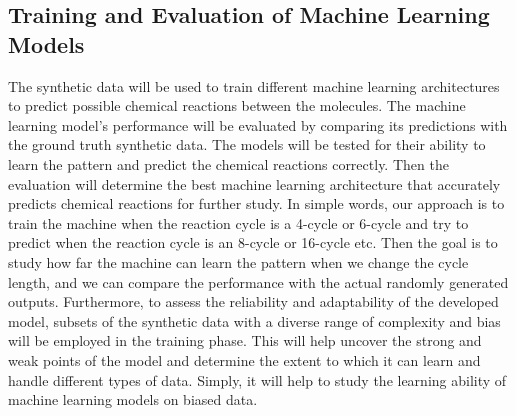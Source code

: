\documentclass{article}
\begin{document}
\subsection{Training and Evaluation of Machine Learning Models}
The synthetic data will be used to train different machine learning architectures to predict possible chemical reactions between the molecules. The machine learning model's performance will be evaluated by comparing its predictions with the ground truth synthetic data. The models will be tested for their ability to learn the pattern and predict the chemical reactions correctly. Then the evaluation will determine the best machine learning architecture that accurately predicts chemical reactions for further study. In simple words, our approach is to train the machine when the reaction cycle is a 4-cycle or 6-cycle and try to predict when the reaction cycle is an 8-cycle or 16-cycle etc. Then the goal is to study how far the machine can learn the pattern when we change the cycle length, and we can compare the performance with the actual randomly generated outputs.
Furthermore, to assess the reliability and adaptability of the developed model, subsets of the synthetic data with a diverse range of complexity and bias will be employed in the training phase. This will help uncover the strong and weak points of the model and determine the extent to which it can learn and handle different types of data. Simply, it will help to study the learning ability of machine learning models on biased data.
\end{document}
